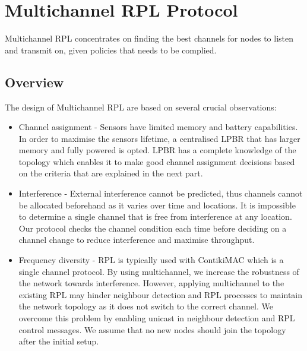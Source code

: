 \section{Multichannel RPL Protocol}
Multichannel RPL concentrates on finding the best channels for nodes to listen and transmit on, given policies that needs to be complied. 

\subsection{Overview}


The design of Multichannel RPL are based on several crucial observations:

\begin{itemize}
\item Channel assignment - Sensors have limited memory and battery capabilities. In order to maximise the sensors lifetime, a centralised LPBR that has larger memory and fully powered is opted. LPBR has a complete knowledge of the topology which enables it to make good channel assignment decisions based on the criteria that are explained in the next part. 

\item Interference - External interference cannot be predicted, thus channels cannot be allocated beforehand as it varies over time and locations. It is impossible to determine a single channel that is free from interference at any location. Our protocol checks the channel condition each time before deciding on a channel change to reduce interference and maximise throughput.

\item Frequency diversity - RPL is typically used with ContikiMAC which is a single channel protocol. By using multichannel, we increase the robustness of the network towards interference. However, applying multichannel to the existing RPL may hinder neighbour detection and RPL processes to maintain the network topology as it does not switch to the correct channel. We overcome this problem by enabling unicast in neighbour detection and RPL control messages. We assume that no new nodes should join the topology after the initial setup.
\end{itemize}

